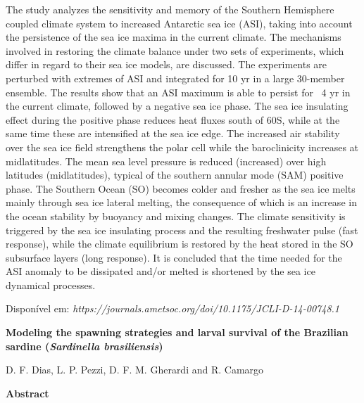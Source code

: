 \noindent The study analyzes the sensitivity and memory of the Southern Hemisphere coupled climate system to increased Antarctic sea ice (ASI), taking into account the persistence of the sea ice maxima in the current climate. The mechanisms involved in restoring the climate balance under two sets of experiments, which differ in regard to their sea ice models, are discussed. The experiments are perturbed with extremes of ASI and integrated for 10 yr in a large 30-member ensemble. The results show that an ASI maximum is able to persist for ~4 yr in the current climate, followed by a negative sea ice phase. The sea ice insulating effect during the positive phase reduces heat fluxes south of 60\degree S, while at the same time these are intensified at the sea ice edge. The increased air stability over the sea ice field strengthens the polar cell while the baroclinicity increases at midlatitudes. The mean sea level pressure is reduced (increased) over high latitudes (midlatitudes), typical of the southern annular mode (SAM) positive phase. The Southern Ocean (SO) becomes colder and fresher as the sea ice melts mainly through sea ice lateral melting, the consequence of which is an increase in the ocean stability by buoyancy and mixing changes. The climate sensitivity is triggered by the sea ice insulating process and the resulting freshwater pulse (fast response), while the climate equilibrium is restored by the heat stored in the SO subsurface layers (long response). It is concluded that the time needed for the ASI anomaly to be dissipated and/or melted is shortened by the sea ice dynamical processes.

\bigskip
\noindent {}
\bigskip

\noindent Disponível em: \textcolor{bleu_cite}{\textit{https://journals.ametsoc.org/doi/10.1175/JCLI-D-14-00748.1}}
\bigskip

\newpage
\bigskip

\noindent \begin{center} \textbf{Modeling the spawning strategies and larval survival of the Brazilian sardine (\textit{Sardinella brasiliensis})}
\bigskip

\noindent D. F. Dias, L. P. Pezzi, D. F. M. Gherardi and R. Camargo
\bigskip

\noindent \textbf{Abstract}\end{center}
\bigskip

